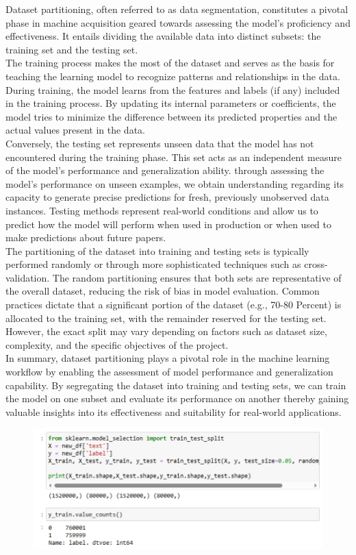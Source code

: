 \begin{description}
Dataset partitioning, often referred to as data segmentation, constitutes a pivotal phase in machine acquisition geared towards assessing the model's proficiency and effectiveness. It entails dividing the available data into distinct subsets: the training set and the testing set.
\\
The training process makes the most of the dataset and serves as the basis for teaching the learning model to recognize patterns and relationships in the data. During training, the model learns from the features and labels (if any) included in the training process. By updating its internal parameters or coefficients, the model tries to minimize the difference between its predicted properties and the actual values present in the data.
\\
Conversely, the testing set represents unseen data that the model has not encountered during the training phase. This set acts as an independent measure of the model's performance and generalization ability. through assessing the model's performance on unseen examples, we obtain understanding regarding its capacity to generate precise predictions for fresh, previously unobserved data instances. Testing methods represent real-world conditions and allow us to predict how the model will perform when used in production or when used to make predictions about future papers.
\\
The partitioning of the dataset into training and testing sets is typically performed randomly or through more sophisticated techniques such as cross-validation. The random partitioning ensures that both sets are representative of the overall dataset, reducing the risk of bias in model evaluation. Common practices dictate that a significant portion of the dataset (e.g., 70-80 Percent) is allocated to the training set, with the remainder reserved for the testing set. However, the exact split may vary depending on factors such as dataset size, complexity, and the specific objectives of the project.
\\
In summary, dataset partitioning plays a pivotal role in the machine learning workflow by enabling the assessment of model performance and generalization capability. By segregating the dataset into training and testing sets, we can train the model on one subset and evaluate its performance on another  thereby gaining valuable insights into its effectiveness and suitability for real-world applications.
 \begin{figure}[hbt!]
  \centering
 \includegraphics[width=0.7\linewidth]{C_chap/fig16.png}
\end{figure}


\end{description}
